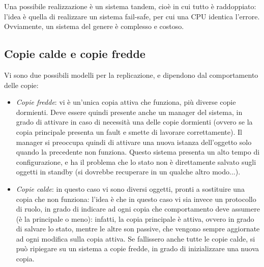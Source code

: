 Una possibile realizzazione è un sistema tandem, cioè in cui tutto è raddoppiato: l'idea è quella di realizzare un
sistema fail-safe, per cui una CPU identica l'errore. Ovviamente, un sistema del genere è complesso e costoso.
\subsection{Copie calde e copie fredde}
Vi sono due possibili modelli per la replicazione, e dipendono dal comportamento delle copie:
\begin{itemize}
 \item \textit{Copie fredde}: vi è un'unica copia attiva che funziona, più diverse copie dormienti. Deve essere quindi
 presente anche un manager del sistema, in grado di attivare in caso di necessità una delle copie dormienti (ovvero se
 la copia principale presenta un fault e smette di lavorare correttamente). Il manager si preoccupa quindi di attivare
 una nuova istanza dell'oggetto solo quando la precedente non funziona. Questo sistema presenta un alto tempo di
 configurazione, e ha il problema che lo stato non è direttamente salvato sugli oggetti in standby (si dovrebbe
 recuperare in un qualche altro modo...).
 \item \textit{Copie calde}: in questo caso vi sono diversi oggetti, pronti a sostituire una copia che non funziona:
 l'idea è che in questo caso vi sia invece un protocollo di ruolo, in grado di indicare ad ogni copia che comportamento
 deve assumere (è la principale o meno): infatti, la copia principale è attiva, ovvero in grado di salvare lo stato,
 mentre le altre son passive, che vengono sempre aggiornate ad ogni modifica sulla copia attiva. Se fallissero anche 
 tutte le copie calde, si può ripiegare su un sistema a copie fredde, in grado di inizializzare una nuova copia.
\end{itemize}

